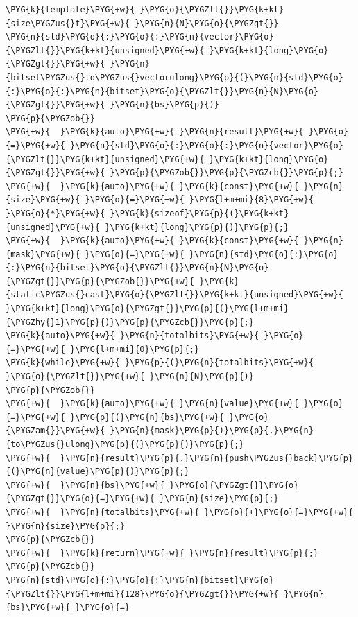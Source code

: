 \begin{itemize}
\begin{codeblockbg}
\begin{Verbatim}[commandchars=\\\{\},breaklines=true,breakanywhere=true,fontsize=\codefont,xleftmargin=17bp]
\PYG{k}{template}\PYG{+w}{ }\PYG{o}{\PYGZlt{}}\PYG{k+kt}{size\PYGZus{}t}\PYG{+w}{ }\PYG{n}{N}\PYG{o}{\PYGZgt{}}
\PYG{n}{std}\PYG{o}{:}\PYG{o}{:}\PYG{n}{vector}\PYG{o}{\PYGZlt{}}\PYG{k+kt}{unsigned}\PYG{+w}{ }\PYG{k+kt}{long}\PYG{o}{\PYGZgt{}}\PYG{+w}{ }\PYG{n}{bitset\PYGZus{}to\PYGZus{}vectorulong}\PYG{p}{(}\PYG{n}{std}\PYG{o}{:}\PYG{o}{:}\PYG{n}{bitset}\PYG{o}{\PYGZlt{}}\PYG{n}{N}\PYG{o}{\PYGZgt{}}\PYG{+w}{ }\PYG{n}{bs}\PYG{p}{)}
\PYG{p}{\PYGZob{}}
\PYG{+w}{  }\PYG{k}{auto}\PYG{+w}{ }\PYG{n}{result}\PYG{+w}{ }\PYG{o}{=}\PYG{+w}{ }\PYG{n}{std}\PYG{o}{:}\PYG{o}{:}\PYG{n}{vector}\PYG{o}{\PYGZlt{}}\PYG{k+kt}{unsigned}\PYG{+w}{ }\PYG{k+kt}{long}\PYG{o}{\PYGZgt{}}\PYG{+w}{ }\PYG{p}{\PYGZob{}}\PYG{p}{\PYGZcb{}}\PYG{p}{;}
\PYG{+w}{  }\PYG{k}{auto}\PYG{+w}{ }\PYG{k}{const}\PYG{+w}{ }\PYG{n}{size}\PYG{+w}{ }\PYG{o}{=}\PYG{+w}{ }\PYG{l+m+mi}{8}\PYG{+w}{ }\PYG{o}{*}\PYG{+w}{ }\PYG{k}{sizeof}\PYG{p}{(}\PYG{k+kt}{unsigned}\PYG{+w}{ }\PYG{k+kt}{long}\PYG{p}{)}\PYG{p}{;}
\PYG{+w}{  }\PYG{k}{auto}\PYG{+w}{ }\PYG{k}{const}\PYG{+w}{ }\PYG{n}{mask}\PYG{+w}{ }\PYG{o}{=}\PYG{+w}{ }\PYG{n}{std}\PYG{o}{:}\PYG{o}{:}\PYG{n}{bitset}\PYG{o}{\PYGZlt{}}\PYG{n}{N}\PYG{o}{\PYGZgt{}}\PYG{p}{\PYGZob{}}\PYG{+w}{ }\PYG{k}{static\PYGZus{}cast}\PYG{o}{\PYGZlt{}}\PYG{k+kt}{unsigned}\PYG{+w}{ }\PYG{k+kt}{long}\PYG{o}{\PYGZgt{}}\PYG{p}{(}\PYG{l+m+mi}{\PYGZhy{}1}\PYG{p}{)}\PYG{p}{\PYGZcb{}}\PYG{p}{;}
\PYG{k}{auto}\PYG{+w}{ }\PYG{n}{totalbits}\PYG{+w}{ }\PYG{o}{=}\PYG{+w}{ }\PYG{l+m+mi}{0}\PYG{p}{;}
\PYG{k}{while}\PYG{+w}{ }\PYG{p}{(}\PYG{n}{totalbits}\PYG{+w}{ }\PYG{o}{\PYGZlt{}}\PYG{+w}{ }\PYG{n}{N}\PYG{p}{)}
\PYG{p}{\PYGZob{}}
\PYG{+w}{  }\PYG{k}{auto}\PYG{+w}{ }\PYG{n}{value}\PYG{+w}{ }\PYG{o}{=}\PYG{+w}{ }\PYG{p}{(}\PYG{n}{bs}\PYG{+w}{ }\PYG{o}{\PYGZam{}}\PYG{+w}{ }\PYG{n}{mask}\PYG{p}{)}\PYG{p}{.}\PYG{n}{to\PYGZus{}ulong}\PYG{p}{(}\PYG{p}{)}\PYG{p}{;}
\PYG{+w}{  }\PYG{n}{result}\PYG{p}{.}\PYG{n}{push\PYGZus{}back}\PYG{p}{(}\PYG{n}{value}\PYG{p}{)}\PYG{p}{;}
\PYG{+w}{  }\PYG{n}{bs}\PYG{+w}{ }\PYG{o}{\PYGZgt{}}\PYG{o}{\PYGZgt{}}\PYG{o}{=}\PYG{+w}{ }\PYG{n}{size}\PYG{p}{;}
\PYG{+w}{  }\PYG{n}{totalbits}\PYG{+w}{ }\PYG{o}{+}\PYG{o}{=}\PYG{+w}{ }\PYG{n}{size}\PYG{p}{;}
\PYG{p}{\PYGZcb{}}
\PYG{+w}{  }\PYG{k}{return}\PYG{+w}{ }\PYG{n}{result}\PYG{p}{;}
\PYG{p}{\PYGZcb{}}
\PYG{n}{std}\PYG{o}{:}\PYG{o}{:}\PYG{n}{bitset}\PYG{o}{\PYGZlt{}}\PYG{l+m+mi}{128}\PYG{o}{\PYGZgt{}}\PYG{+w}{ }\PYG{n}{bs}\PYG{+w}{ }\PYG{o}{=}

\end{Verbatim}
\end{codeblockbg}
\end{itemize}
